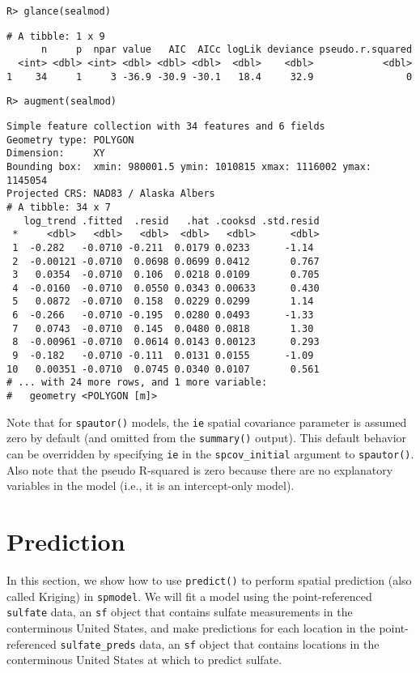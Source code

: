 \documentclass[10pt,letterpaper]{article}
\begin{document}
\begin{verbatim}
R> glance(sealmod)
\end{verbatim}

\begin{verbatim}
# A tibble: 1 x 9
      n     p  npar value   AIC  AICc logLik deviance pseudo.r.squared
  <int> <dbl> <int> <dbl> <dbl> <dbl>  <dbl>    <dbl>            <dbl>
1    34     1     3 -36.9 -30.9 -30.1   18.4     32.9                0
\end{verbatim}

\begin{verbatim}
R> augment(sealmod)
\end{verbatim}

\begin{verbatim}
Simple feature collection with 34 features and 6 fields
Geometry type: POLYGON
Dimension:     XY
Bounding box:  xmin: 980001.5 ymin: 1010815 xmax: 1116002 ymax: 1145054
Projected CRS: NAD83 / Alaska Albers
# A tibble: 34 x 7
   log_trend .fitted  .resid   .hat .cooksd .std.resid
 *     <dbl>   <dbl>   <dbl>  <dbl>   <dbl>      <dbl>
 1  -0.282   -0.0710 -0.211  0.0179 0.0233      -1.14 
 2  -0.00121 -0.0710  0.0698 0.0699 0.0412       0.767
 3   0.0354  -0.0710  0.106  0.0218 0.0109       0.705
 4  -0.0160  -0.0710  0.0550 0.0343 0.00633      0.430
 5   0.0872  -0.0710  0.158  0.0229 0.0299       1.14 
 6  -0.266   -0.0710 -0.195  0.0280 0.0493      -1.33 
 7   0.0743  -0.0710  0.145  0.0480 0.0818       1.30 
 8  -0.00961 -0.0710  0.0614 0.0143 0.00123      0.293
 9  -0.182   -0.0710 -0.111  0.0131 0.0155      -1.09 
10   0.00351 -0.0710  0.0745 0.0340 0.0107       0.561
# ... with 24 more rows, and 1 more variable:
#   geometry <POLYGON [m]>
\end{verbatim}

Note that for \texttt{spautor()} models, the \texttt{ie} spatial
covariance parameter is assumed zero by default (and omitted from the
\texttt{summary()} output). This default behavior can be overridden by
specifying \texttt{ie} in the \texttt{spcov\_initial} argument to
\texttt{spautor()}. Also note that the pseudo R-squared is zero because
there are no explanatory variables in the model (i.e., it is an
intercept-only model).

\hypertarget{sec:prediction}{%
\section{Prediction}\label{sec:prediction}}

In this section, we show how to use \texttt{predict()} to perform
spatial prediction (also called Kriging) in \texttt{spmodel}. We will
fit a model using the point-referenced \texttt{sulfate} data, an
\texttt{sf} object that contains sulfate measurements in the
conterminous United States, and make predictions for each location in
the point-referenced \texttt{sulfate\_preds} data, an \texttt{sf} object
that contains locations in the conterminous United States at which to
predict sulfate.
\end{document}
